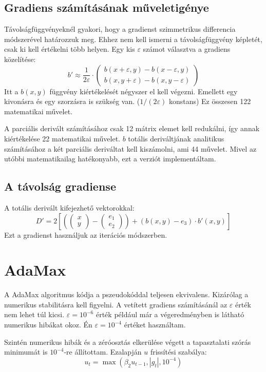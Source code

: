 \subsection{Gradiens számításának műveletigénye}
Távolságfüggvényeknél gyakori, hogy a gradienst szimmetrikus differencia módszerével határozzuk meg. Ehhez nem kell ismerni a távolságfüggvény képletét, csak ki kell értékelni több helyen. Egy kis $\varepsilon$ számot választva a gradiens közelítése: 
$$ b' \approx \frac{1}{2\varepsilon} \cdot \begin{pmatrix} b(x+\varepsilon,y) - b(x-\varepsilon,y) \\ b(x,y+\varepsilon) - b(x,y-\varepsilon) \end{pmatrix} $$
Itt a $b(x,y)$ függvény kiértékelését négyszer el kell végezni. Emellett egy kivonásra és egy szorzásra is szükség van. ($1/(2\varepsilon)$ konstans) Ez összesen 122 matematikai művelet. 

A parciális derivált számításához csak 12 mátrix elemet kell redukálni, így annak kiértékelése 22 matematikai művelet. $b$ totális deriváltjának analitikus számításához a két parciális deriváltat kell kiszámolni, ami 44 művelet. Mivel az utóbbi matematikailag hatékonyabb, ezt a verziót implementáltam.

\subsection{A távolság gradiense}
A totális derivált kifejezhető vektorokkal:
$$ D' = 2\left[\left(\begin{pmatrix} x \\ y \end{pmatrix} - \begin{pmatrix} e_1 \\ e_2  \end{pmatrix}\right)  + (b(x,y)-e_3)\cdot b'(x,y) \right]$$
Ezt a gradienst használjuk az iterációs módszerben. 


\section{AdaMax}
A AdaMax algoritmus kódja a pszeudokóddal teljesen ekvivalens. Kizárólag a numerikus stabilitásra kell figyelni. A vetített gradiens számításánál az $\varepsilon$ érték nem lehet túl kicsi. $\varepsilon = 10^{-6}$ érték például már a végeredményben is látható numerikus hibákat okoz. Én $\varepsilon = 10^{-4}$ értéket használtam.

Szintén numerikus hibák és a zéróosztás elkerülése végett a tapasztalati szórás minimumát is $10^{-4}$-re állítottam. Ezalapján $u$ frissítési szabálya: 
$$ u_t = \max (\beta_2 u_{t-1}, |g_t|, 10^{-4}) $$

